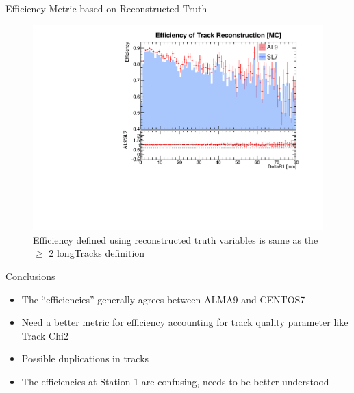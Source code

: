 \begin{frame}{Efficiency Metric based on Reconstructed Truth}
    \begin{figure}
        \includegraphics[width=\linewidth]{output/NEffi_MC_pass_DeltaR1.pdf}
        \caption{Efficiency defined using reconstructed truth variables is same as the $\geq$ 2 longTracks definition}
    \end{figure}
    
\end{frame}

\begin{frame}{Conclusions}
    \begin{itemize}
        \item The ``efficiencies'' generally agrees between ALMA9 and CENTOS7
        \item Need a better metric for efficiency accounting for track quality parameter like Track Chi2
        \item Possible duplications in tracks 
        \item The efficiencies at Station 1 are confusing, needs to be better understood
    \end{itemize}
\end{frame}

    
